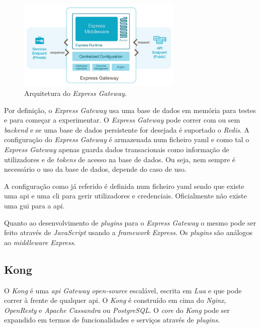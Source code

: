 \begin{figure}[H]
    \begin{center}
        \includegraphics[width=0.7\textwidth]{img/expressGatArch.png}
    \end{center}
    \caption{Arquitetura do \textit{Express Gateway}.~\cite{kongArch}}
\end{figure}

Por definição, o \textit{Express Gateway} usa uma base de dados em memória para testes e para começar a experimentar. O \textit{Express Gateway} pode correr com ou sem \textit{backend} e se uma base de dados persistente for desejada é suportado o \textit{Redis}. A configuração do \textit{Express Gateway} é armazenada num ficheiro \acrshort{yaml} e como tal o \textit{Express Gateway} apenas guarda dados transacionais como informação de utilizadores e de \textit{tokens} de acesso na base de dados. Ou seja, nem sempre é necessário o uso da base de dados, depende do caso de uso.

A configuração como já referido é definida num ficheiro \acrshort{yaml} sendo que existe uma \acrshort{api} e uma \acrshort{cli} para gerir utilizadores e credenciais. Oficialmente não existe uma \acrshort{gui} para a \acrshort{api}.

Quanto ao desenvolvimento de \textit{plugins} para o \textit{Express Gateway} o mesmo pode ser feito através de \textit{JavaScript} usando a \textit{framework} \textit{Express}. Os \textit{plugins} são análogos ao \textit{middleware} \textit{Express}. 

\subsection{Kong}

O \textit{Kong} é uma \textit{\acrshort{api} Gateway} \textit{open-source} escalável, escrita em \textit{Lua} e que pode correr à frente de qualquer \acrshort{api}. O \textit{Kong} é construído em cima do \textit{Nginx}, \textit{OpenResty} e \textit{Apache Cassandra} ou \textit{PostgreSQL}. O \textit{core} do \textit{Kong} pode ser expandido em termos de funcionalidades e serviços através de \textit{plugins}.

